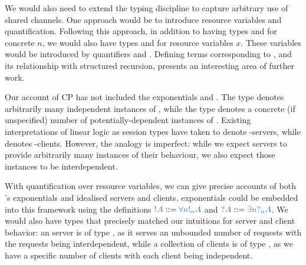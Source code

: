 \documentclass[UKenglish]{llncs}
\begin{document}
We would also need to extend the typing discipline to capture arbitrary use of
shared channels.  One approach would be to introduce resource variables and
quantification.  Following this approach, in addition to having types
 and  for concrete $n$, we would also have types
 and  for resource variables $x$.  These variables
would be introduced by quantifiers  and .
Defining terms corresponding to , and its relationship with
structured recursion, presents an interesting area of further work.

Our account of CP has not included the exponentials  and . The type  denotes arbitrarily many independent instances of
, while the type  denotes a concrete (if unspecified) number
of potentially-dependent instances of .  Existing interpretations of
linear logic as session types have taken  to denote -servers,
while  denotes -clients.  However, the analogy is imperfect:
while we expect servers to provide arbitrarily many instances of their
behaviour, we also expect those instances to be interdependent.

With quantification over resource variables, we can give precise accounts of
both \cp's exponentials and idealised servers and clients. \cp exponentials
could be embedded into this framework using the definitions $\ty{\take{A}} ::=
\ty{\forall{n}\take[n]{A}}$ and $\ty{\give{A}} ::= \ty{\exists{n}{\give[n]{A}}}$.
We would also have types that precisely matched our intuitions for server and
client behavior:
an  server is of type , as it serves an
unbounded number of requests with the requests being interdependent, while a
collection of  clients is of type , as we have
a specific number of clients with each client being independent.

\clearpage
\printbibliography
\end{document}
